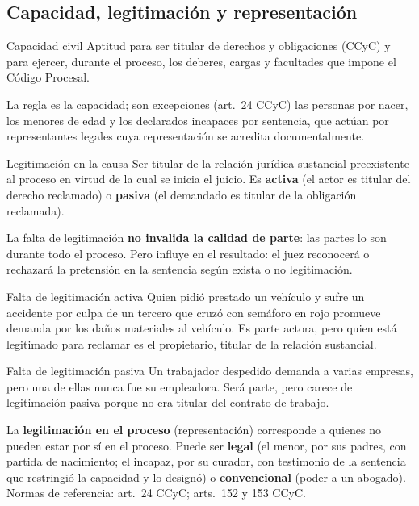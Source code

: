 \documentclass[12pt,oneside]{book}
\begin{document}
\subsection{Capacidad, legitimación y representación}

\begin{definicion}{Capacidad civil}
Aptitud para ser titular de derechos y obligaciones (CCyC) y para ejercer, durante el proceso, los deberes, cargas y facultades que impone el Código Procesal.
\end{definicion}

La regla es la capacidad; son excepciones (art.~24 CCyC) las personas por nacer, los menores de edad y los declarados incapaces por sentencia, que actúan por representantes legales cuya representación se acredita documentalmente.

\begin{definicion}{Legitimación en la causa}
Ser titular de la relación jurídica sustancial preexistente al proceso en virtud de la cual se inicia el juicio. Es \textbf{activa} (el actor es titular del derecho reclamado) o \textbf{pasiva} (el demandado es titular de la obligación reclamada).
\end{definicion}

\begin{importante}
La falta de legitimación \textbf{no invalida la calidad de parte}: las partes lo son durante todo el proceso. Pero influye en el resultado: el juez reconocerá o rechazará la pretensión en la sentencia según exista o no legitimación.
\end{importante}

\begin{ejemplo}{Falta de legitimación activa}
Quien pidió prestado un vehículo y sufre un accidente por culpa de un tercero que cruzó con semáforo en rojo promueve demanda por los daños materiales al vehículo. Es parte actora, pero quien está legitimado para reclamar es el propietario, titular de la relación sustancial.
\end{ejemplo}

\begin{ejemplo}{Falta de legitimación pasiva}
Un trabajador despedido demanda a varias empresas, pero una de ellas nunca fue su empleadora. Será parte, pero carece de legitimación pasiva porque no era titular del contrato de trabajo.
\end{ejemplo}

La \textbf{legitimación en el proceso} (representación) corresponde a quienes no pueden estar por sí en el proceso. Puede ser \textbf{legal} (el menor, por sus padres, con partida de nacimiento; el incapaz, por su curador, con testimonio de la sentencia que restringió la capacidad y lo designó) o \textbf{convencional} (poder a un abogado). Normas de referencia: art.~24 CCyC; arts.~152 y 153 CCyC.
\end{document}

